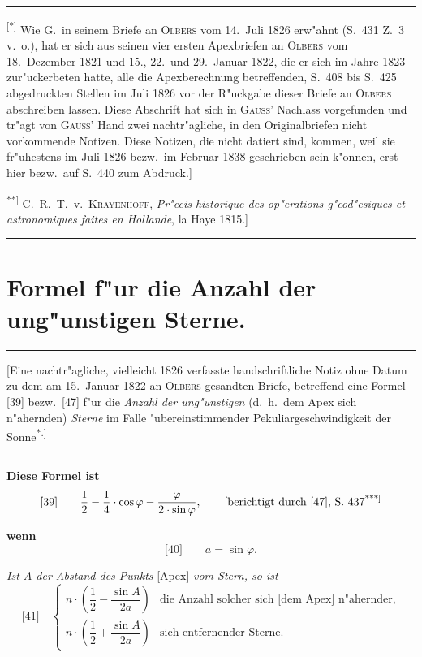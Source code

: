 \documentclass[12pt,a4paper]{article}
\theoremstyle{plain}
\theoremstyle{definition}
\theoremstyle{remark}
\begin{document}
\rule{\textwidth}{0.4pt}
{\small
\textsuperscript{[*]} Wie G.\ in seinem Briefe an \textsc{Olbers} vom 14.\ Juli 1826 erw"ahnt (S.\ 431 Z.\ 3 v.\ o.), hat er sich aus seinen vier ersten \glq{}Apexbriefen\grq{} an \textsc{Olbers} vom 18.\ Dezember 1821 und 15., 22.\ und 29.\ Januar 1822, die er sich im Jahre 1823 zur"uckerbeten hatte, alle die Apexberechnung betreffenden, S.\ 408 bis S.\ 425 abgedruckten Stellen im Juli 1826 vor der R"uckgabe dieser Briefe an \textsc{Olbers} abschreiben lassen. Diese Abschrift hat sich in \textsc{Gau\ss{}'} Nachlass vorgefunden und tr"agt von \textsc{Gau\ss{}'} Hand zwei nachtr"agliche, in den Originalbriefen nicht vorkommende Notizen. Diese Notizen, die nicht datiert sind, kommen, weil sie fr"uhestens im Juli 1826 bezw.\ im Februar 1838 geschrieben sein k"onnen, erst hier bezw.\ auf S.\ 440 zum Abdruck.]

\textsuperscript{**]} C.\ R.\ T.\ v.\ \textsc{Krayenhoff}, {\itshape Pr"ecis historique des op"erations g"eod"esiques et astronomiques faites en Hollande}, la Haye 1815.]
}
\rule{\textwidth}{0.4pt}


\newpage
\section*{Formel f"ur die Anzahl der \glq{}ung"unstigen\grq{} Sterne.}

\rule{\textwidth}{0.4pt}
\begin{center}
\small
[Eine nachtr"agliche, vielleicht 1826 verfasste handschriftliche Notiz ohne Datum zu dem am 15.\ Januar 1822 an \textsc{Olbers} gesandten Briefe, betreffend eine Formel [39] bezw.\ [47] f"ur die {\itshape Anzahl der \glq{}ung"unstigen\grq{}} (d.\ h.\ dem Apex sich n"ahernden) {\itshape Sterne} im Falle "ubereinstimmender Pekuliargeschwindigkeit der Sonne\textsuperscript{*.]}
\end{center}
\rule{\textwidth}{0.4pt}

\vspace{1em}
\noindent
\textbf{Diese Formel ist}
\[
\text{[39]}\qquad \frac{1}{2} - \frac{1}{4}\cdot\cos\varphi - \frac{\varphi}{2\cdot\sin\varphi},
\qquad
\text{[berichtigt durch [47], S.\ 437\textsuperscript{***]}}
\]

\vspace{1em}
\noindent
\textbf{wenn}
\[
\text{[40]}\qquad a = \sin\varphi.
\]

\noindent
{\itshape Ist $A$ der Abstand des Punkts} [Apex] {\itshape vom Stern, so ist}
\[
\text{[41]}\quad
\left\{\begin{array}{lll}
n\cdot\left(\dfrac{1}{2} - \dfrac{\sin A}{2a}\right) & \text{die Anzahl solcher sich [dem Apex] n"ahernder,}\\[1em]
n\cdot\left(\dfrac{1}{2} + \dfrac{\sin A}{2a}\right) & \text{sich entfernender Sterne.}
\end{array}\right.
\]
\end{document}
